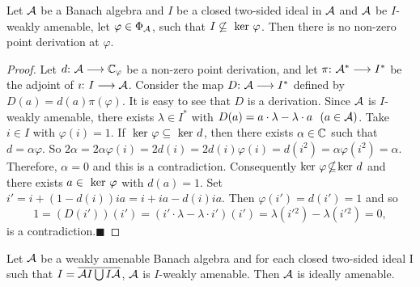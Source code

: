 \documentclass[fleqn]{mat01}
\begin{document}
\begin{theor}[\!] 
Let $\cal A$ be a Banach algebra and $I$ be a closed two-sided ideal in
$\cal A$ and $\cal A$ be $I$-weakly amenable{\rm ,} let $\varphi\in
\Phi_{\cal A}${\rm ,} such that $I\not\subseteq\ {\rm ker}~\varphi$. Then
there is no non-zero point derivation at $\varphi$.
\end{theor}

\begin{proof}
Let $d\hbox{:}\ {\cal A}\longrightarrow \Bbb C_\varphi$ be a non-zero
point derivation, and let $\pi\hbox{:}\ {\cal A}^*\longrightarrow I^*$
be the adjoint of $\imath\hbox{:}\ {I}\longrightarrow {\cal A}$.
Consider the map $D\hbox{:}\ {\cal A} \longrightarrow I^*$ defined by
$D(a)=d(a)\pi(\varphi)$. It is easy to see that $D$ is a derivation.
Since $\cal A$ is $I$-weakly amenable, there exists $\lambda\in I^* $
with $D(a)=a\cdot\lambda-\lambda \cdot a~~(a\in {\cal A})$. Take $i\in
I$ with $\varphi(i)=1$. If $\hbox{ ker} \ \varphi \subseteq\ \hbox{ker}\
d$, then there exists $\alpha \in \Bbb C$ such that $d= \alpha \varphi$.
So $2\alpha = 2 \alpha \varphi(i)=2 d(i)= 2 d(i) \varphi(i) = d(i^2) =
\alpha \varphi(i^2) =\alpha$. Therefore, $\alpha=0$ and this is a
contradiction. Consequently $\hbox{ker}\ \varphi\!\nsubseteq\!\hbox{ker}\
d$ and there exists $a\in \ \hbox{ker}\ \varphi$ with $d(a)=1$. Set
$i'=i+(1-d(i))ia=i+ia -d(i)ia$. Then $\varphi(i')=d(i')=1$ and so
\begin{equation*}
1=(D(i'))(i')=(i'\cdot\lambda-\lambda\cdot i')(i')= \lambda(i'{^2}) -
\lambda(i'{^2})=0,
\end{equation*}
is a contradiction.\hfill $\blacksquare$
\end{proof}

\begin{theor}[\!]
Let ${\cal A}$ be a weakly amenable Banach algebra and for each closed
two-sided ideal I such that $I=\overline{{\cal A}I\bigcup I{\cal A}}${\rm ,}
${\cal A}$ is $I$-weakly amenable. Then ${\cal A}$ is ideally amenable.
\end{theor}
\end{document}
